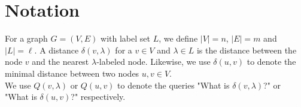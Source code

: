 \section{Notation}
\label{sec:notation}
For a graph $G=(V,E)$ with label set $L$, we define $|V|=n$, $|E|=m$ and $|L|=\ell$. A
distance $\delta(v,\lambda)$ for a $v\in V$ and $\lambda\in L$ is the distance between
the node $v$ and the nearest $\lambda$-labeled node. Likewise, we use $\delta(u,v)$ to denote
the minimal distance between two nodes $u,v\in V$. \\
We use $Q(v,\lambda)$ or $Q(u,v)$ to denote the queries "What is $\delta(v,\lambda)$?" or
"What is $\delta(u,v)$?" respectively. 
